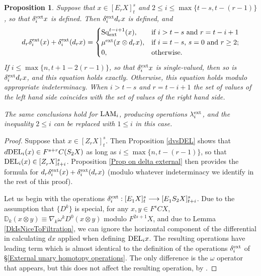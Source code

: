 \documentclass[11pt]{amsart} \renewcommand{\baselinestretch}{1.4}
\theoremstyle{plain}
\newtheorem{prop}[thm]{Proposition}
\theoremstyle{definition}
\renewcommand{\to}{\longrightarrow}
\newcommand{\twist}{\omega}
\newcommand{\Sq}{\mathrm{Sq}}
\newcommand{\E}[5]{[E^{#1}_{#2}#3]^{#4}_{#5}}
\newcommand{\Edownup}[5]{[E_{#1}^{#2}#3]^{#4}_{#5}}
\newcommand{\EZdownup}[5]{[Z^{#2}_{#1}#3]^{#4}_{#5}}
\newcommand{\uver}{^\mathrm{v}}
\begin{document}
\begin{second quadrant homotopy sseq operations}
\begin{prop}
Suppose that $x\in \E{}{r}{X}{s}{t}$ and $2\leq i\leq \max\{t-s,t-(r-1)\}$, so that $\delta^\textup{ext}_ix $ is defined. Then $\delta^\textup{ext}_i d_r x$ is defined, and 
\[d_r\delta^\textup{ext}_i(x)+ \delta^\textup{ext}_i(d_rx)=\begin{cases}
\Sq_\textup{ext}^{t-i+1}(x),&\textup{if $i>t-s$ and $r =t-i+1$}\\
\mu^\textup{ext}(x\otimes d_rx),&\textup{if $i=t-s$,  $s=0$ and $r\geq2$};\\
0,&\textup{otherwise.}
\end{cases}\]
If $i\leq \max\{n,t+1-2(r-1)\}$, so that $\delta^\textup{ext}_i x$ is single-valued, then so is $\delta^\textup{ext}_i d_r x$, and this equation holds exactly. Otherwise, this equation holds modulo appropriate indeterminacy. When $i>t-s$ and $r =t-i+1$ the set of values of the left hand side coincides with the set of values of the right hand side.  

The same conclusions hold for $\textup{LAM}_i$, producing operations $\lambda_i^\textup{ext}$, and the inequality $2\leq i$ can be replaced with $1\leq i$ in this case.
\end{prop}
\begin{proof}
Suppose that $x\in \EZdownup{r}{}{X}{s}{t}$. Then Proposition \ref{dvsDEL} shows that $d\textup{DEL}_i(x)\in F^{s+r}C(S_2X)$ as long as $i\leq \max\{n,t-(r-1)\}$, so that $\textup{DEL}_i(x)\in \EZdownup{r}{}{X}{s}{t+i}$. 
Proposition \ref{Prop on delta external} then provides the formula for 
$d_r\delta^\textup{ext}_i(x)+ \delta^\textup{ext}_i(d_rx)$ (modulo whatever indeterminacy we identify in the rest of this proof).

Let us begin with the operations $\delta^\textup{ext}_i:\Edownup{1}{}{X}{s}{t}\to \Edownup{1}{}{S_2X}{s}{t+i}$. Due to the assumption that $\{D^k\}$ is special, for any $x,y\in F^{s}CX$, $\mathbb{D}_k(x\otimes  y)\equiv \nabla_k\twist^k D^0(x\otimes y) $ modulo $F^{2s+1}X$, and due to Lemma \ref{DkIsNiceToFiltration}, we can ignore the horizontal component of the differential in calculating $dx$ applied when defining $\textup{DEL}_ix$. The resulting operations have leading term which is almost identical to the definition of the operations $\delta_i^\textup{ext}$ of \S\ref{External unary homotopy operations}. The only difference is the $\twist$ operator that appears, but this does not affect the resulting operation, by \cite[Lemma 4.1]{DwyerHtpyOpsSimpComAlg.pdf}.


\end{proof}
\end{second quadrant homotopy sseq operations}
\end{document}
